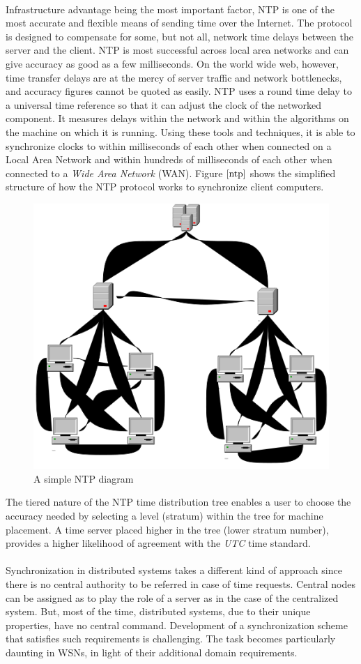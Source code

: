 \documentclass[a4paper,10pt]{report}
\begin{document}
\paragraph*{}
Infrastructure advantage being the most important factor, NTP is one of the most accurate and flexible means of sending time over the Internet. The protocol is designed to compensate for some, but not all, network time delays between the server and the client. NTP is most successful across local area networks and can give accuracy as good as a few milliseconds. On the world wide web, however, time transfer delays are at the mercy of server traffic and network bottlenecks, and accuracy figures cannot be quoted as easily. NTP uses a round time delay to a universal time reference so that it can adjust the clock of the networked component. It measures delays within the network and within the algorithms on the machine on which it is running. Using  these tools and techniques, it is able to synchronize clocks to within milliseconds of each other when connected on a Local Area Network and within hundreds of milliseconds of each other when connected to a \textit{Wide Area Network} (WAN). Figure $\ref{ntp}$ shows the simplified structure of how the NTP protocol works to synchronize client computers.
\begin{figure}
\centering
\includegraphics[width= 0.5 \textwidth]{ntp}
\caption{A simple NTP diagram} \label{ntp}
\end{figure}
The tiered nature of the NTP time distribution tree enables a user to choose the accuracy needed by selecting a level (stratum) within
the tree for machine placement. A time server placed higher in the tree (lower stratum number), provides a higher likelihood of
agreement with the \textit{UTC} time standard.
\paragraph*{}
Synchronization in distributed systems takes a different kind of approach since there is no central authority to be referred
in case of time requests. Central nodes can be assigned as to play the role of a server as in the case of the centralized system.
But, most of the time, distributed systems, due to their unique properties, have no central command. Development of a synchronization
scheme that satisfies such requirements is challenging. The task becomes particularly daunting in WSNs, in light of their additional
domain requirements.
\end{document}
